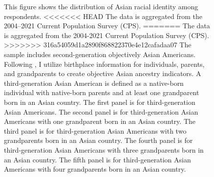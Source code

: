 \begin{landscape}
\begin{figure}[!htb]
\caption*{\footnotesize{This figure shows the distribution of Asian racial identity among respondents. 
<<<<<<< HEAD
The data is aggregated from the 2004--2021 Current Population Survey (CPS). 
=======
The data is aggregated from the 2004-2021 Current Population Survey (CPS). 
>>>>>>> 316a54059d1a2890f868822370e4e12cafadaa07
The sample includes second-generation objectively Asian Americans.
Following \textcite{antmanEthnicAttritionObserved2016,antmanEthnicAttritionAssimilation2020}, 
I utilize birthplace information for individuals, parents, and grandparents to create objective Asian ancestry indicators.
A third-generation Asian American is defined as a native-born individual with native-born parents and at least one grandparent born in an Asian country. 
The first panel is for third-generation Asian Americans. The second panel is for third-generation Asian Americans with one grandparent born in an Asian country. 
The third panel is for third-generation Asian Americans with two grandparents born in an Asian country. 
The fourth panel is for third-generation Asian Americans with three grandparents born in an Asian country.
The fifth panel is for third-generation Asian Americans with four grandparents born in an Asian country.
}}
\end{figure}
\end{landscape}

\pagebreak
\newpage

